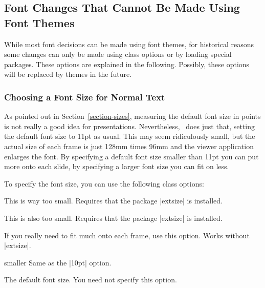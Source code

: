 \subsection{Font Changes That Cannot Be Made Using Font Themes} 

While most font decisions can be made using font themes, for
historical reasons some changes can only be made using class
options or by loading special packages. These options are explained in
the following. Possibly, these options will be replaced by themes in
the future.


\subsubsection{Choosing a Font Size for Normal Text}

As pointed out in Section~\ref{section-sizes}, measuring the default
font size in points is not really a good idea for
presentations. Nevertheless, \beamer\ does just that, setting the
default font size to 11pt as usual. This may seem ridiculously small, but 
the actual size of each frame is just 128mm times 96mm and the viewer
application enlarges the font. By specifying a default font size
smaller than 11pt you can put more onto each slide, by specifying a
larger font size you can fit on less.

To specify the font size, you can use the following class options:

\begin{classoption}{8pt}
  This is way too small. Requires that the package |extsize|
  is installed.
\end{classoption}

\begin{classoption}{9pt}
  This is also too small. Requires that the package |extsize|
  is installed.
\end{classoption}

\begin{classoption}{10pt}
  If you really need to fit much onto each frame, use this
  option. Works without |extsize|.
\end{classoption}

\begin{classoption}{smaller}
  Same as the |10pt| option.
\end{classoption}

\begin{classoption}{11pt}
  The default font size. You need not specify this option.
\end{classoption}

